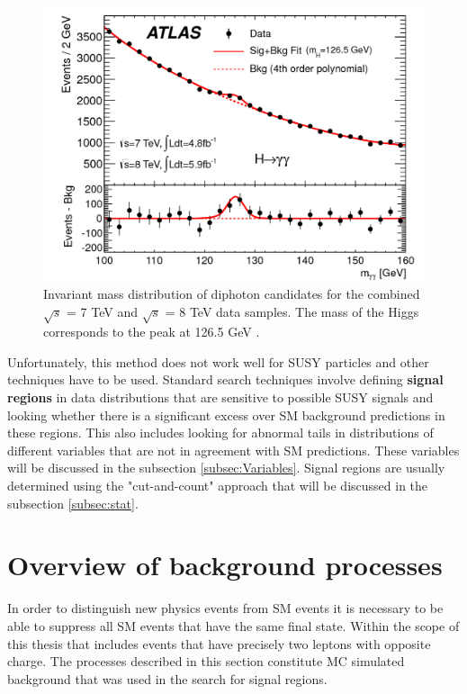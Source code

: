 \begin{figure}
	\centering
	\captionsetup{width=0.8\textwidth}
	\includegraphics[scale=0.2]{Chap3/figaux_004a}
	\caption[Invariant mass of diphoton events: discovery of the Higgs]{Invariant mass distribution of diphoton 				candidates for the combined $\sqrt{s}$ = 7 TeV and $\sqrt{s}$ = 8 TeV 			data samples. The mass of the Higgs corresponds to the peak at 126.5 				GeV \citep{Aad:2012tfa}.}
\end{figure}

Unfortunately, this method does not work well for SUSY particles and other techniques have to be used. Standard search techniques involve defining \textbf{signal regions} in data distributions that are sensitive to possible SUSY signals and looking whether there is a significant excess over SM background predictions in these regions. 
This also includes looking for abnormal tails in distributions of different variables that are not in agreement with SM predictions. These variables will be discussed in the subsection \ref{subsec:Variables}. Signal regions are usually determined using the "cut-and-count" approach that will be discussed in the subsection \ref{subsec:stat}.

\section{Overview of background processes}
In order to distinguish new physics events from SM events it is necessary to be able to suppress all SM events that have the same final state. Within the scope of this thesis that includes events that have precisely two leptons with opposite charge. The processes described in this section constitute MC simulated background that was used in the search for signal regions.

